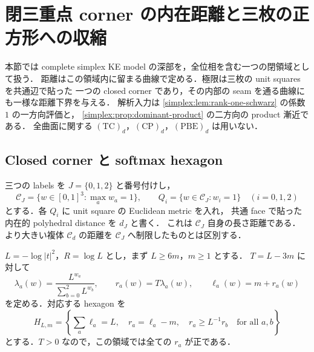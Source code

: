 \section{閉三重点 corner の内在距離と三枚の正方形への収縮}
\label{simplex:sec:closed-corner-metric}

本節では complete simplex KE model の深部を，全位相を含む一つの閉領域として扱う．
距離はこの領域内に留まる曲線で定める．極限は三枚の unit squares を共通辺で貼った
一つの closed corner であり，その内部の seam を通る曲線にも一様な距離下界を与える．
解析入力は \cref{simplex:lem:rank-one-schwarz} の係数 $1$ の一方向評価と，
\cref{simplex:prop:dominant-product} の二方向の product 漸近である．
全曲面に関する $\mathrm{(TC)}_d$，$\mathrm{(CP)}_d$，$\mathrm{(PBE)}_d$ は用いない．

\subsection{Closed corner と softmax hexagon}

三つの labels を $J=\{0,1,2\}$ と番号付けし，
\[
 \mathcal C_J=\{w\in[0,1]^3:\max_a w_a=1\},
 \qquad
 Q_i=\{w\in\mathcal C_J:w_i=1\}\quad(i=0,1,2)
\]
とする．各 $Q_i$ に unit square の Euclidean metric を入れ，
共通 face で貼った内在的 polyhedral distance を $d_J$ と書く．
これは $\mathcal C_J$ 自身の長さ距離である．
より大きい複体 $\mathcal C_d$ の距離を $\mathcal C_J$ へ制限したものとは区別する．

$L=-\log|t|^2$，$R=\log L$ とし，まず $L\ge6m$，$m\ge1$ とする．
$T=L-3m$ に対して
\begin{equation}\label{simplex:eq:softmax-hexagon}
 \lambda_a(w)=\frac{L^{w_a}}{\sum_{b=0}^2L^{w_b}},
 \qquad
 r_a(w)=T\lambda_a(w),
 \qquad
 \ell_a(w)=m+r_a(w)
\end{equation}
を定める．対応する hexagon を
\begin{equation}\label{simplex:eq:closed-hexagon-domain}
 H_{L,m}
 =\left\{\sum_a\ell_a=L,\quad
       r_a=\ell_a-m,\quad
       r_a\ge L^{-1}r_b\quad\text{for all }a,b\right\}
\end{equation}
とする．$T>0$ なので，この領域では全ての $r_a$ が正である．

